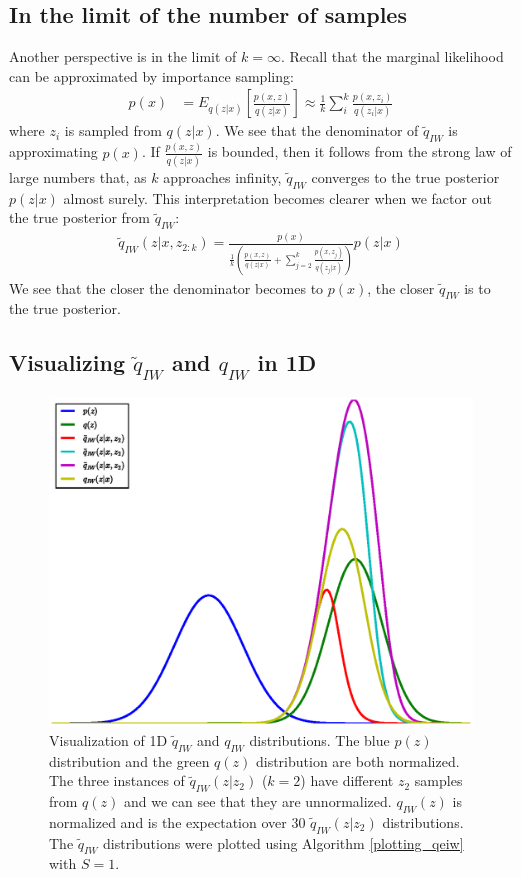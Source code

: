 \documentclass{article} %
\begin{document}
\subsection{In the limit of the number of samples}

Another perspective is in the limit of ${k=\infty}$. Recall that the marginal likelihood can be approximated by importance sampling:
\begin{align} 
    p(x) &= E_{q(z|x)}\left[\frac{p(x,z)}{q(z|x)} \right] \approx \frac{1}{k}\sum_i^k \frac{p(x,z_i)}{q(z_i|x)}
\end{align}
where $z_i$ is sampled from $q(z|x)$. We see that the denominator of $\tilde{q}_{IW}$ is approximating $p(x)$. If $\frac{p(x,z)}{q(z|x)}$ is bounded, then it follows from the strong law of large numbers that, as $k$ approaches infinity, $\tilde{q}_{IW}$ converges to the true posterior $p(z|x)$ almost surely. This interpretation becomes clearer when we factor out the true posterior from $\tilde{q}_{IW}$:
\begin{align} 
\tilde{q}_{IW}(z|x,z_{2:k}) =  \frac{p(x)}{  \frac{1}{k} \left( \frac{p(x,z)}{q(z|x)}+ \sum_{j=2}^k \frac{p(x,z_j)}{q(z_j|x)} \right) }  p(z|x)
\end{align}
We see that the closer the denominator becomes to $p(x)$, the closer $\tilde{q}_{IW}$ is to the true posterior.








\subsection{Visualizing \texorpdfstring{$\tilde{q}_{IW}$}{} and \texorpdfstring{$q_{IW}$}{} in 1D}
\label{viz_section}

\begin{figure}[H]
  \centering
      \includegraphics[width=.5\textwidth]{figs/figure_1.eps}
  \caption{Visualization of 1D $\tilde{q}_{IW}$ and $q_{IW}$ distributions. The blue $p(z)$ distribution and the green $q(z)$ distribution are both normalized. The three instances of $\tilde{q}_{IW}(z|z_2)$ ($k=2$) have different $z_2$ samples from $q(z)$ and we can see that they are unnormalized. $q_{IW}(z)$ is normalized and is the expectation over 30 $\tilde{q}_{IW}(z|z_2)$ distributions. The $\tilde{q}_{IW}$ distributions were plotted using Algorithm \ref{plotting_qeiw} with $S=1$.}
  \label{viz}
\end{figure}
\end{document}
